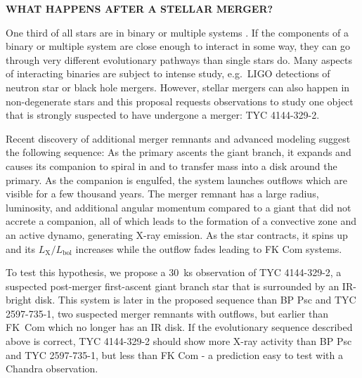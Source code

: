 \documentclass[letterpaper,11pt]{article}
\begin{document}
\pagestyle{plain}


 

\begin{center} 
\bfseries\uppercase{%
What happens after a stellar merger?
}
\end{center}

One third of all stars are in binary or multiple systems \cite{Raghavan+2010}. If the components of a binary or multiple system are close enough to interact in some way, they can go through very different evolutionary pathways than single stars do. 
Many aspects of interacting binaries are subject to intense study, e.g.\ LIGO detections of neutron star or black hole mergers. However, stellar mergers can also happen in non-degenerate stars and this proposal requests observations to study one object that is strongly suspected to have undergone a merger: TYC 4144-329-2. 

Recent discovery of additional merger remnants and advanced modeling suggest the following sequence: As the primary ascents the giant branch, it expands and causes its companion to spiral in and to transfer mass into a disk around the primary. As the companion is engulfed, the system launches outflows which are visible for a few thousand years. The merger remnant has a large radius, luminosity, and additional angular momentum compared to a giant that did not accrete a companion, all of which leads to the formation of a convective zone and an active dynamo, generating X-ray emission. As the star contracts, it spins up and its $L_\mathrm{X}/L_\mathrm{bol}$ increases while the outflow fades leading to FK Com systems. 

To test this hypothesis, we propose a 30~ks observation of TYC 4144-329-2, a suspected post-merger first-ascent giant branch star that is surrounded by an IR-bright disk. This system is later in the proposed sequence than BP Psc and  TYC 2597-735-1, two suspected merger remnants with outflows, but earlier than FK~Com which no longer has an IR disk. If the evolutionary sequence described above is correct, TYC 4144-329-2 should show more X-ray activity than BP Psc and  TYC 2597-735-1, but less than FK Com - a prediction easy to test with a Chandra observation.
\end{document}
